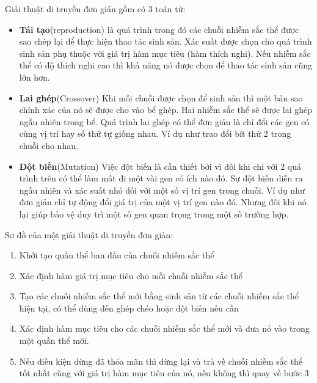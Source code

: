 Giải thuật di truyền đơn giản gồm có 3 toán tử:
\begin{itemize}
\item \textbf{Tái tạo}(reproduction) là quá trình trong đó các chuỗi nhiễm sắc thể được sao chép lại để thực hiện thao tác sinh sản. Xác suất được chọn cho quá trình sinh sản phụ thuộc với giá trị hàm mục tiêu (hàm thích nghi). Nếu nhiễm sắc thể có độ thích nghi cao thì khả năng nó được chọn để thao tác sinh sản cũng lớn hơn.
\item \textbf{Lai ghép}(Crossover) Khi mỗi chuỗi được chọn để sinh sản thì một bản sao chính xác của nó sẽ được cho vào bể ghép. Hai nhiễm sắc thể sẽ được lai ghép ngẫu nhiên trong bể. Quá trình lai ghép có thể đơn giản là chỉ đổi các gen có cùng vị trí hay số thứ tự giống nhau. Ví dụ như trao đổi bít thứ 2 trong chuỗi cho nhau.
\item \textbf{Đột biến}(Mutation) Việc đột biến là cần thiết bởi vì đôi khi chỉ với 2 quá trình trên có thể làm mất đi một vài gen có ích nào đó. Sự đột biến diễn ra ngẫu nhiên và xác suất nhỏ đối với một số vị trí gen trong chuỗi. Ví dụ như đơn giản chỉ tự động đổi giá trị của một vị trí gen nào đó. Nhưng đôi khi nó lại giúp bảo vệ duy trì một số gen quan trọng trong một số trường hợp.
\end{itemize}

Sơ đồ của một giải thuật di truyền đơn giản:
\begin{enumerate}
\item Khởi tạo quần thể ban đầu của chuỗi nhiễm sắc thể
\item Xác định hàm giá trị mục tiêu cho mỗi chuỗi nhiễm sắc thể
\item Tạo các chuỗi nhiễm sắc thể mới bằng sinh sản từ các chuỗi nhiễm sắc thể hiện tại, có thể dùng đến ghép chéo hoặc đột biến nếu cần
\item Xác  định hàm mục tiêu cho các chuỗi nhiễm sắc thể  mới và đưa nó vào trong một quần thể  mới. 
\item Nếu điều kiện dừng đã thỏa mãn thì dừng lại và trả về  chuỗi nhiễm sắc thể 
tốt nhất cùng với giá trị hàm mục tiêu của nó, nếu không thì quay về  bước 3
\end{enumerate}

